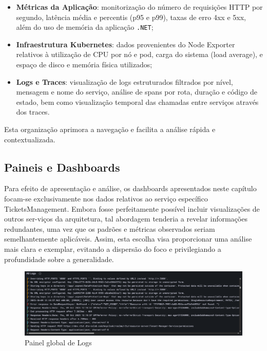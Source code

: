 \begin{itemize}
    \item \textbf{Métricas da Aplicação}: monitorização do número de requisições HTTP por segundo, latência média e percentis (p95 e p99), taxas de erro 4xx e 5xx, além do uso de memória da aplicação \texttt{.NET};
    \item \textbf{Infraestrutura Kubernetes}: dados provenientes do Node Exporter relativos à utilização de CPU por nó e pod, carga do sistema (load average), e espaço de disco e memória física utilizados;
    \item \textbf{Logs e Traces}: visualização de logs estruturados filtrados por nível, mensagem e nome do serviço, análise de spans por rota, duração e código de estado, bem como visualização temporal das chamadas entre serviços através dos traces.
\end{itemize}

Esta organização aprimora a navegação e facilita a análise rápida e contextualizada.

\subsection{Paineis e Dashboards}

Para efeito de apresentação e análise, os dashboards apresentados neste capítulo focam-se exclusivamente nos dados relativos ao serviço específico TicketsManagement. Embora fosse perfeitamente possível incluir visualizações de outros ser-viços da arquitetura, tal abordagem tenderia a revelar informações redundantes, uma vez que os padrões e métricas observados seriam semelhantemente aplicáveis. Assim, esta escolha visa proporcionar uma análise mais clara e exemplar, evitando a dispersão do foco e privilegiando a profundidade sobre a generalidade.

\begin{figure}[H]
    \centering
    \includegraphics[width=1\textwidth]{images/Grafana/all_logs_dashboard.png}
    \caption{Painel global de Logs}
\end{figure}

